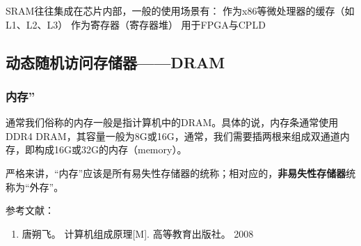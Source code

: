 SRAM往往集成在芯片内部，一般的使用场景有：
作为x86等微处理器的缓存（如L1、L2、L3）
作为寄存器（寄存器堆）
用于FPGA与CPLD

\subsection{动态随机访问存储器——DRAM}



\subsubsection{内存”}

通常我们俗称的内存一般是指计算机中的DRAM。具体的说，内存条通常使用DDR4 DRAM，其容量一般为8G或16G，通常，我们需要插两根来组成双通道内存，即构成16G或32G的内存（memory）。

严格来讲，“内存”应该是所有易失性存储器的统称；相对应的，\textbf{非易失性存储器}统称为“外存”。






参考文献：
\begin{enumerate}
\item 唐朔飞。 计算机组成原理[M]. 高等教育出版社。 2008
\end{enumerate}

